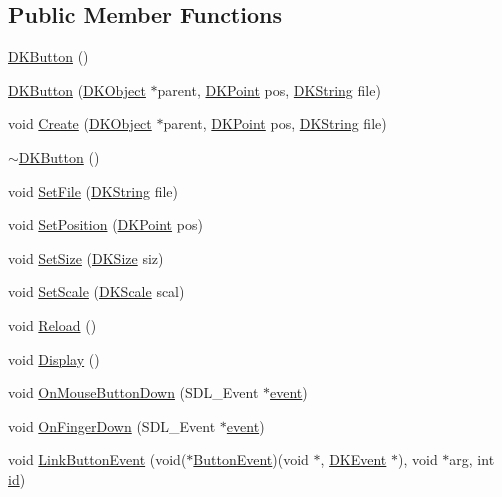 \subsection*{Public Member Functions}
\begin{DoxyCompactItemize}
\item 
\hyperlink{class_d_k_button_a6a906f8c3d6ae0e14399c0b464e441b5}{D\-K\-Button} ()
\item 
\hyperlink{class_d_k_button_a769d52b62e53ddbc7514626dd5cd5504}{D\-K\-Button} (\hyperlink{class_d_k_object}{D\-K\-Object} $\ast$parent, \hyperlink{_d_k_axis_8h_a0ca1f005fbb936f8e7a7f2433591f418}{D\-K\-Point} pos, \hyperlink{_d_k_string_8h_ac168e8555ceba18e1a2919b21976bc84}{D\-K\-String} file)
\item 
void \hyperlink{class_d_k_button_a76293848a1b6841afdf68630b7a0f791}{Create} (\hyperlink{class_d_k_object}{D\-K\-Object} $\ast$parent, \hyperlink{_d_k_axis_8h_a0ca1f005fbb936f8e7a7f2433591f418}{D\-K\-Point} pos, \hyperlink{_d_k_string_8h_ac168e8555ceba18e1a2919b21976bc84}{D\-K\-String} file)
\item 
\hyperlink{class_d_k_button_ad3d93fbc9df29c406d9f2aaedfd06631}{$\sim$\-D\-K\-Button} ()
\item 
void \hyperlink{class_d_k_button_ad85fbd7163ee143ae8294c11522b1a7e}{Set\-File} (\hyperlink{_d_k_string_8h_ac168e8555ceba18e1a2919b21976bc84}{D\-K\-String} file)
\item 
void \hyperlink{class_d_k_button_a47b665824379b9e06647a18bbc673f42}{Set\-Position} (\hyperlink{_d_k_axis_8h_a0ca1f005fbb936f8e7a7f2433591f418}{D\-K\-Point} pos)
\item 
void \hyperlink{class_d_k_button_aa134fa11edf8c95b0aa2a2a293f567d5}{Set\-Size} (\hyperlink{_d_k_axis_8h_aaa25a8c7cbf504fffdb8a4208ff7a731}{D\-K\-Size} siz)
\item 
void \hyperlink{class_d_k_button_a6bebbb437cc9283ad4b0e12c1d04b633}{Set\-Scale} (\hyperlink{_d_k_axis_8h_ab9e555d97d32f68d4c77474d1e1ba787}{D\-K\-Scale} scal)
\item 
void \hyperlink{class_d_k_button_ab9265483f5a95a0a0bcda443da0c8ba8}{Reload} ()
\item 
void \hyperlink{class_d_k_button_a069233fdf7ee0343cfae37cb26bc21e4}{Display} ()
\item 
void \hyperlink{class_d_k_button_a644647583157cf8aac3b6c3c1583a081}{On\-Mouse\-Button\-Down} (S\-D\-L\-\_\-\-Event $\ast$\hyperlink{class_d_k_event_a3deebb932ed734363c4ece87971bc45f}{event})
\item 
void \hyperlink{class_d_k_button_a02b6f47239afa6b9f5d1a175fbebdadd}{On\-Finger\-Down} (S\-D\-L\-\_\-\-Event $\ast$\hyperlink{class_d_k_event_a3deebb932ed734363c4ece87971bc45f}{event})
\item 
void \hyperlink{class_d_k_button_a59be0f8d454426f2162bbe209892e665}{Link\-Button\-Event} (void($\ast$\hyperlink{class_d_k_event_af10c62bd55119142c44deeafcba7c3d7}{Button\-Event})(void $\ast$, \hyperlink{class_d_k_event}{D\-K\-Event} $\ast$), void $\ast$arg, int \hyperlink{class_d_k_event_a46877918e12fcb3b2c8988379b6fa6fa}{id})
\end{DoxyCompactItemize}

